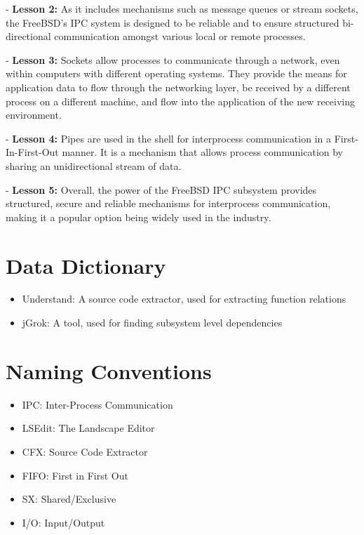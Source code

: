 \documentclass[12pt, dvipsnames, a4paper]{article}
\begin{document}
- \textbf{Lesson 2:} As it includes mechanisms such as message queues or stream sockets, the FreeBSD’s IPC system is designed to be reliable and to ensure structured bi-directional communication amongst various local or remote processes.

- \textbf{Lesson 3:} Sockets allow processes to communicate through a network, even within computers with different operating systems. They provide the means for application data to flow through the networking layer, be received by a different process on a different machine, and flow into the application of the new receiving environment.

- \textbf{Lesson 4:} Pipes are used in the shell for interprocess communication in a First-In-First-Out manner. It is a mechanism that allows process communication by sharing an unidirectional stream of data.

- \textbf{Lesson 5:} Overall, the power of the FreeBSD IPC subsystem provides structured, secure and reliable mechanisms for interprocess communication, making it a popular option being widely used in the industry.
\clearpage

\section{Data Dictionary}
\begin{itemize}
	\item{Understand: A source code extractor, used for extracting function relations}
	\item {jGrok: A tool, used for finding subsystem level dependencies}
\end{itemize}

\section{Naming Conventions}
\begin{itemize}
	\item {IPC: Inter-Process Communication}
	      \item{LSEdit: The Landscape Editor}
	\item {CFX: Source Code Extractor}
	\item {FIFO: First in First Out}
	      \item{SX: Shared/Exclusive}
	      \item{I/O: Input/Output}
\end{itemize}
\end{document}
